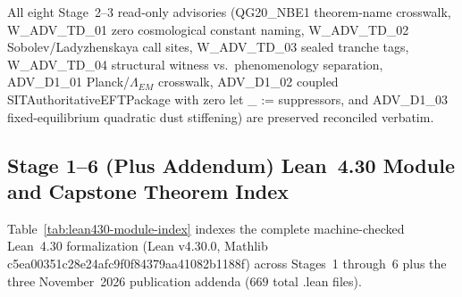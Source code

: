 \documentclass[american,11pt,letterpaper]{article}
\def\mathrm#1{#1}%
\def\texttt#1{#1}%
\begin{document}
All eight Stage~2--3 read-only advisories (\texttt{QG20\_NBE1} theorem-name crosswalk, \texttt{W\_ADV\_TD\_01} zero cosmological constant naming, \texttt{W\_ADV\_TD\_02} Sobolev/Ladyzhenskaya call sites, \texttt{W\_ADV\_TD\_03} sealed tranche tags, \texttt{W\_ADV\_TD\_04} structural witness vs.\ phenomenology separation, \texttt{ADV\_D1\_01} Planck/$\Lambda_{\mathrm{EM}}$ crosswalk, \texttt{ADV\_D1\_02} coupled \texttt{SITAuthoritative\allowbreak{}EFTPackage} with zero \texttt{let \_ :=} suppressors, and \texttt{ADV\_D1\_03} fixed-equilibrium quadratic dust stiffening) are preserved reconciled verbatim.

\subsection{Stage 1--6 (Plus Addendum) Lean~4.30 Module and Capstone Theorem Index}

Table~\ref{tab:lean430-module-index} indexes the complete machine-checked Lean~4.30 formalization (\texttt{Lean v4.30.0}, Mathlib \texttt{c5ea00351c28e24afc9f0f84379aa41082b1188f}) across Stages~1 through~6 plus the three November~2026 publication addenda ($669$ total \texttt{.lean} files).
\end{document}

